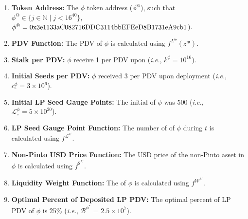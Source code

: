 \documentclass[class=article, crop=false]{standalone}
\begin{document}
\begin{enumerate}

    \item \textbf{Token Address:} The $\phi$ token address ($\phi^{@}$), such that $\phi^{@} \in \{j \in \mathbb{N} \mid j < 16^{40} \}$, $\phi^{@} = \\ \text{0x3e1133aC082716DDC3114bbEFEeD8B1731eA9cb1}$).
    
    \item \textbf{PDV Function:} The PDV of $\phi$ is calculated using $f^{L^{\mathfrak{w}}}(z^{\mathfrak{w}})$.
                
    \item \textbf{Stalk per PDV:} $\phi$  receive 1  per PDV upon  (\textit{i.e.}, $k^{\phi} = 10^{16}$).
    
    \item \textbf{Initial Seeds per PDV:} $\phi$  received 3  per PDV upon deployment (\textit{i.e.}, ${c_{\circ}^{\phi}} = 3 \times 10^6$).

    \item \textbf{Initial LP Seed Gauge Points:} The initial  of $\phi$ was 500 (\textit{i.e.}, $\mathscr{L}_{\circ}^{\phi} = 5 \times 10^{20}$).
    
    \item \textbf{LP Seed Gauge Point Function:} The number of  of $\phi$ during $t$ is calculated using $f^{\mathscr{L}^{\lambda'}}$.
    
    \item \textbf{Non-Pinto USD Price Function:} The USD price of the non-Pinto asset in $\phi$ is calculated using $f^{\$^{\lambda'}}$.

    \item \textbf{Liquidity Weight Function:} The  of $\phi$ is calculated using $f^{\mathscr{W}^{\lambda'}}$.
    
    \item \textbf{Optimal Percent of Deposited LP PDV:} The optimal percent of  LP PDV of $\phi$ is 25\% (\textit{i.e.}, $\mathscr{B}^{\phi^{*}}$ = $2.5 \times 10^{7}$).


\end{enumerate}
\end{document}
